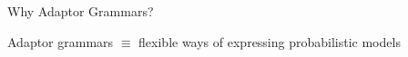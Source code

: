 


\begin{frame}{Why Adaptor Grammars?}
  \begin{center}
      Adaptor grammars $\equiv$ flexible ways of expressing
      probabilistic models
    \vspace{2mm}

    \pause



\end{center}
\end{frame}
